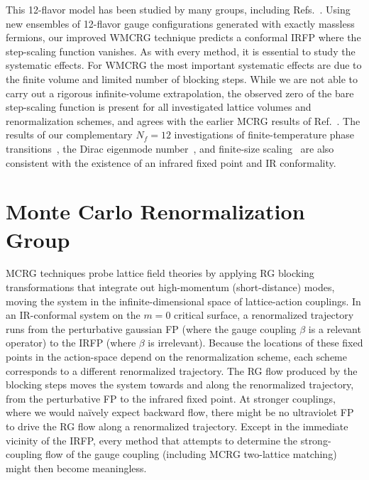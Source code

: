 \documentclass{PoS}
\newcommand{\be}{\ensuremath{\beta} }
\newcommand{\refcite}[1]{Ref.~\cite{#1}}
\begin{document}
This 12-flavor model has been studied by many groups, including Refs.~\cite{Appelquist:2009ty, Deuzeman:2009mh, Fodor:2011tu, Appelquist:2011dp, Hasenfratz:2011xn, DeGrand:2011cu, Cheng:2011ic, Jin:2012dw, Lin:2012iw, Aoki:2012eq, Fodor:2012uw, Fodor:2012et, Itou:2012qn, Cheng:2013eu, Aoki:2013pca, Hasenfratz:2013uha, Hasenfratz:2013eka, Cheng:2013bca}.
Using new ensembles of 12-flavor gauge configurations generated with exactly massless fermions, our improved WMCRG technique predicts a conformal IRFP where the step-scaling function vanishes.
As with every method, it is essential to study the systematic effects.
For WMCRG the most important systematic effects are due to the finite volume and limited number of blocking steps.
While we are not able to carry out a rigorous infinite-volume extrapolation, the observed zero of the bare step-scaling function is present for all investigated lattice volumes and renormalization schemes, and agrees with the earlier MCRG results of \refcite{Hasenfratz:2011xn}.
The results of our complementary $N_f = 12$ investigations of finite-temperature phase transitions~\cite{Schaich:2012fr, Hasenfratz:2013uha}, the Dirac eigenmode number~\cite{Cheng:2013eu, Cheng:2013bca}, and finite-size scaling~\cite{Hasenfratz:2013eka} are also consistent with the existence of an infrared fixed point and IR conformality.



\section{\label{sec:mcrg}Monte Carlo Renormalization Group} %
MCRG techniques probe lattice field theories by applying RG blocking transformations that integrate out high-momentum (short-distance) modes, moving the system in the infinite-dimensional space of lattice-action couplings.
In an IR-conformal system on the $m = 0$ critical surface, a renormalized trajectory runs from the perturbative gaussian FP (where the gauge coupling \be is a relevant operator) to the IRFP (where \be is irrelevant).
Because the locations of these fixed points in the action-space depend on the renormalization scheme, each scheme corresponds to a different renormalized trajectory.
The RG flow produced by the blocking steps moves the system towards and along the renormalized trajectory, from the perturbative FP to the infrared fixed point.
At stronger couplings, where we would na\"ively expect backward flow, there might be no ultraviolet FP to drive the RG flow along a renormalized trajectory.
Except in the immediate vicinity of the IRFP, every method that attempts to determine the strong-coupling flow of the gauge coupling (including MCRG two-lattice matching) might then become meaningless.
\end{document}
